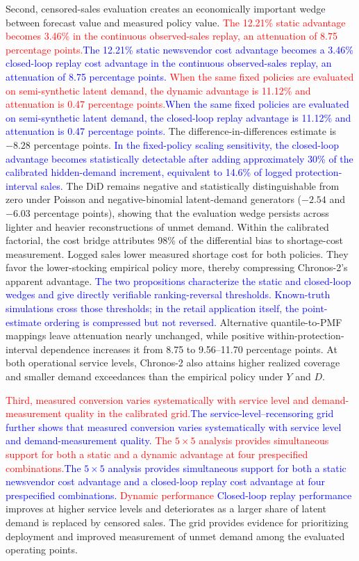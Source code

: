 \documentclass[msom,dblanonrev]{informs4}
\newcommand{\add}[1]{\textcolor{blue}{#1}}
\newcommand{\reduce}[1]{\textcolor{red}{#1}\hspace{0.5em}}
\begin{document}
Second, censored-sales evaluation creates an economically important wedge between forecast value and measured policy value.
\reduce{The 12.21\% static advantage becomes 3.46\% in the continuous observed-sales replay, an attenuation of 8.75 percentage points.}\add{The 12.21\% static newsvendor cost advantage becomes a 3.46\% closed-loop replay cost advantage in the continuous observed-sales replay, an attenuation of 8.75 percentage points.}
\reduce{When the same fixed policies are evaluated on semi-synthetic latent demand, the dynamic advantage is 11.12\% and attenuation is 0.47 percentage points.}\add{When the same fixed policies are evaluated on semi-synthetic latent demand, the closed-loop replay advantage is 11.12\% and attenuation is 0.47 percentage points.}
The difference-in-differences estimate is $-8.28$ percentage points.
\add{In the fixed-policy scaling sensitivity, the closed-loop advantage becomes statistically detectable after adding approximately 30\% of the calibrated hidden-demand increment, equivalent to 14.6\% of logged protection-interval sales.}
The DiD remains negative and statistically distinguishable from zero under Poisson and negative-binomial latent-demand generators ($-2.54$ and $-6.03$ percentage points), showing that the evaluation wedge persists across lighter and heavier reconstructions of unmet demand.
Within the calibrated factorial, the cost bridge attributes 98\% of the differential bias to shortage-cost measurement.
Logged sales lower measured shortage cost for both policies.
They favor the lower-stocking empirical policy more, thereby compressing Chronos-2's apparent advantage.
\add{The two propositions characterize the static and closed-loop wedges and give directly verifiable ranking-reversal thresholds. Known-truth simulations cross those thresholds; in the retail application itself, the point-estimate ordering is compressed but not reversed.}
Alternative quantile-to-PMF mappings leave attenuation nearly unchanged, while positive within-protection-interval dependence increases it from 8.75 to 9.56--11.70 percentage points.
At both operational service levels, Chronos-2 also attains higher realized coverage and smaller demand exceedances than the empirical policy under $Y$ and $D$.

\reduce{Third, measured conversion varies systematically with service level and demand-measurement quality in the calibrated grid.}\add{The service-level--recensoring grid further shows that measured conversion varies systematically with service level and demand-measurement quality.}
\reduce{The $5\times5$ analysis provides simultaneous support for both a static and a dynamic advantage at four prespecified combinations.}\add{The $5\times5$ analysis provides simultaneous support for both a static newsvendor cost advantage and a closed-loop replay cost advantage at four prespecified combinations.}
\reduce{Dynamic performance}
\add{Closed-loop replay performance} improves at higher service levels and deteriorates as a larger share of latent demand is replaced by censored sales.
The grid provides evidence for prioritizing deployment and improved measurement of unmet demand among the evaluated operating points.
\end{document}
